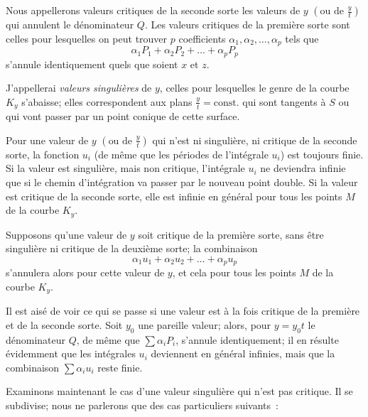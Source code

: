 \documentclass{article}
\begin{document}
Nous appellerons valeurs critiques de la seconde sorte les valeurs de $y$ $\left(\text{ou de } \frac{y}{t}\right)$ qui annulent le dénominateur $Q$. Les valeurs critiques de la première sorte sont celles pour lesquelles on peut trouver $p$ coefficients $\alpha_{1}, \alpha_{2}, \ldots, \alpha_{p}$ tels que
\[
\alpha_{1} P_{1} + \alpha_{2} P_{2} + \ldots + \alpha_{p} P_{p}
\]
s'annule identiquement quels que soient $x$ et $z$.

J'appellerai \emph{valeurs singulières} de $y$, celles pour lesquelles le genre de la courbe $K_{y}$ s'abaisse; elles correspondent aux plans $\frac{y}{t} = \text{const.}$ qui sont tangents à $S$ ou qui vont passer par un point conique de cette surface.

Pour une valeur de $y$ $\left(\text{ou de } \frac{y}{t}\right)$ qui n'est ni singulière, ni critique de la seconde sorte, la fonction $u_{i}$ (de même que les périodes de l'intégrale $u_{i}$) est toujours finie. Si la valeur est singulière, mais non critique, l'intégrale $u_{i}$ ne deviendra infinie que si le chemin d'intégration va passer par le nouveau point double. Si la valeur est critique de la seconde sorte, elle est infinie en général pour tous les points $M$ de la courbe $K_{y}$.

Supposons qu'une valeur de $y$ soit critique de la première sorte, sans être singulière ni critique de la deuxième sorte; la combinaison
\[
\alpha_{1} u_{1} + \alpha_{2} u_{2} + \ldots + \alpha_{p} u_{p}
\]
s'annulera alors pour cette valeur de $y$, et cela pour tous les points $M$ de la courbe $K_{y}$.

Il est aisé de voir ce qui se passe si une valeur est à la fois critique de la première
et de la seconde sorte. Soit $y_{0}$ une pareille valeur; alors, pour $y = y_{0} t$ le dénominateur $Q$, de même que $\displaystyle\sum \alpha_{i} P_{i}$, s'annule identiquement; il en résulte évidemment que les intégrales $u_{i}$ deviennent en général infinies, mais que la combinaison $\displaystyle\sum \alpha_{i} u_{i}$ reste finie.

Examinons maintenant le cas d'une valeur singulière qui n'est pas critique. Il se subdivise; nous ne parlerons que des cas particuliers suivants~:
\end{document}
